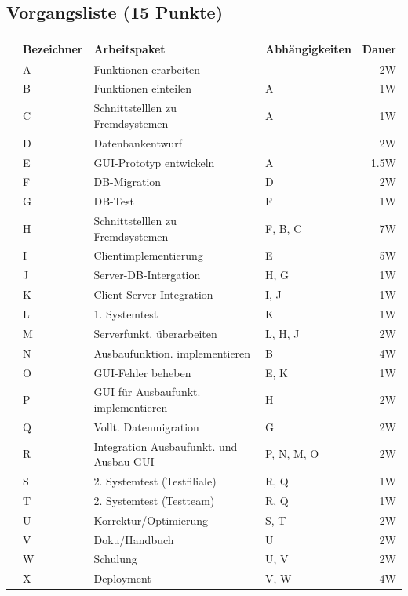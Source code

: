 \documentclass{scrartcl}
\begin{document}
\subsection{Vorgangsliste (15 Punkte)}
\begin{center}
   \renewcommand{\arraystretch}{1.5}
   \begin{tabular}{l:lllr}
      \toprule
      &Bezeichner & Arbeitspaket & Abhängigkeiten & Dauer\\
      \midrule
      &A & Funktionen erarbeiten & & 2W\\
      &B & Funktionen einteilen & A & 1W\\
      &C & Schnittstelllen zu Fremdsystemen & A & 1W\\
      &D & Datenbankentwurf & & 2W \\
      &E & GUI-Prototyp entwickeln & A & 1.5W\\
      \midrule
      &F & DB-Migration & D & 2W \\
      &G & DB-Test & F& 1W \\
      &H & Schnittstelllen zu Fremdsystemen & F, B, C & 7W \\
      &I & Clientimplementierung & E & 5W \\
      &J & Server-DB-Intergation & H, G& 1W \\
      &K & Client-Server-Integration & I, J & 1W \\
      &L & 1. Systemtest & K & 1W \\
      \midrule
      &M & Serverfunkt. überarbeiten & L, H, J& 2W \\
      &N & Ausbaufunktion.  implementieren & B & 4W\\
      &O & GUI-Fehler beheben & E, K & 1W \\
      &P & GUI für Ausbaufunkt. implementieren & H & 2W \\
      &Q & Vollt. Datenmigration & G & 2W \\
      &R & Integration Ausbaufunkt.  und Ausbau-GUI & P, N, M, O & 2W \\
      &S & 2. Systemtest (Testfiliale) & R, Q & 1W \\
      &T & 2. Systemtest (Testteam) & R, Q & 1W \\
      \midrule
      &U & Korrektur/Optimierung & S, T & 2W \\
      &V & Doku/Handbuch & U & 2W \\
      &W & Schulung & U, V & 2W \\
      &X & Deployment &  V, W & 4W\\
      \bottomrule
   \end{tabular}
\end{center}
\end{document}
